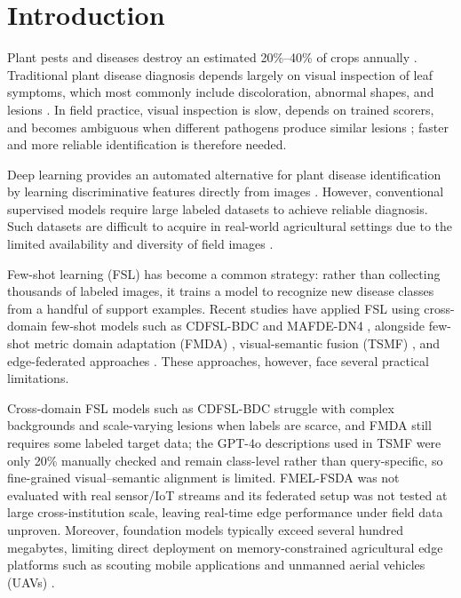 \documentclass[conference]{IEEEtran}
\begin{document}

\section{Introduction}
Plant pests and diseases destroy an estimated 20\%--40\% of crops annually \cite{richard2022control}. Traditional plant disease diagnosis depends largely on visual inspection of leaf symptoms, which most commonly include discoloration, abnormal shapes, and lesions \cite{khakimov2022traditional}. In field practice, visual inspection is slow, depends on trained scorers, and becomes ambiguous when different pathogens produce similar lesions \cite{shoaib2023advanced}; faster and more reliable identification is therefore needed.

Deep learning provides an automated alternative for plant disease identification by learning discriminative features directly from images \cite{shoaib2023advanced}. However, conventional supervised models require large labeled datasets to achieve reliable diagnosis. Such datasets are difficult to acquire in real-world agricultural settings due to the limited availability and diversity of field images \cite{shoaib2023advanced, shafik2023systematic}.

Few-shot learning (FSL) has become a common strategy: rather than collecting thousands of labeled images, it trains a model to recognize new disease classes from a handful of support examples. Recent studies have applied FSL using cross-domain few-shot models such as CDFSL-BDC \cite{yang2024laboratory} and MAFDE-DN4 \cite{zhao2024mafde}, alongside few-shot metric domain adaptation (FMDA) \cite{kudo2025few}, visual-semantic fusion (TSMF) \cite{zhou2026vsf}, and edge-federated approaches \cite{sharif2026real}. These approaches, however, face several practical limitations.

Cross-domain FSL models such as CDFSL-BDC \cite{yang2024laboratory} struggle with complex backgrounds and scale-varying lesions when labels are scarce, and FMDA \cite{kudo2025few} still requires some labeled target data; the GPT-4o descriptions used in TSMF \cite{zhou2026vsf} were only 20\% manually checked and remain class-level rather than query-specific, so fine-grained visual--semantic alignment is limited. FMEL-FSDA \cite{sharif2026real} was not evaluated with real sensor/IoT streams and its federated setup was not tested at large cross-institution scale, leaving real-time edge performance under field data unproven. Moreover, foundation models typically exceed several hundred megabytes, limiting direct deployment on memory-constrained agricultural edge platforms such as scouting mobile applications and unmanned aerial vehicles (UAVs) \cite{zhao2026lightweight}.
\end{document}
